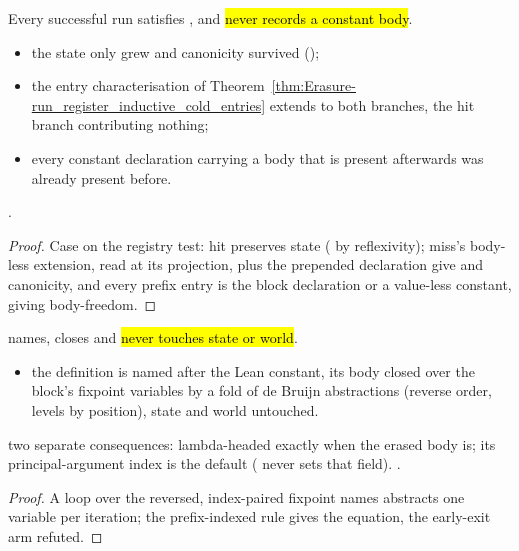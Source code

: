 \begin{theorem}
\label{thm:Erasure-run_register_inductive_runConcl}
\leanok
{}
 Every successful  run satisfies , and
\hl{never records a constant body}.
\begin{itemize}
\item {} the state only grew and canonicity survived ();
\item the entry characterisation of Theorem~\ref{thm:Erasure-run_register_inductive_cold_entries}
extends to both branches, the hit branch contributing nothing;
\item every constant declaration carrying a body that is present afterwards was already present
before.
\end{itemize}
 \stProved{}.
\end{theorem}
\begin{proof}
\leanok
{}
 Case on the registry test: hit preserves state ( by reflexivity); miss's
body-less extension, read at its  projection, plus the prepended declaration give
 and canonicity, and every prefix entry is the block declaration or a value-less
constant, giving body-freedom.
\end{proof}

\begin{theorem}
\label{thm:Erasure-run_mkDef_ok}
\leanok
{}
  names, closes and \hl{never touches state or
world}.
\begin{itemize}
\item {} the definition is named after the Lean constant, its body closed over the block's
fixpoint variables by a fold of de Bruijn abstractions (reverse order, levels by position), state and
world untouched.
\end{itemize}
 two separate consequences: lambda-headed exactly when the erased body is; its
principal-argument index is the default  ( never sets that field).
 \stProved{}.
\end{theorem}
\begin{proof}
\leanok
{}
 A  loop over the reversed, index-paired fixpoint names abstracts one variable
per iteration; the prefix-indexed  rule gives the equation, the early-exit arm refuted.
\end{proof}

